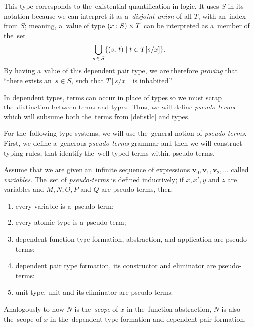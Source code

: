 This type corresponds to the~existential quantification in logic. It uses $S$ in
its notation because we can interpret it as a~\emph{disjoint union} of all $T$,
with an~index from $S$; meaning, a~value of type $(x \overset{}: S) \times T$ can be
interpreted as a~member of the~set
\[
  \bigcup_{s \, \in \, S} \{ (s, \, t) \mid t \in T[s/x] \}.
\]
By having a~value of this dependent pair type, we are therefore \emph{proving}
that ``there exists an~$s \in S$, such that $T[s/x]$ is inhabited.''

In dependent types, terms can occur in place of types so we must scrap
the~distinction between terms and types. Thus, we will define
\emph{pseudo-terms} which will subsume both the~terms from \autoref{def:stlc}
and types.


For the~following type systems, we will use the~general notion of
\emph{pseudo-terms}. First, we define a~generous \emph{pseudo-terms} grammar and
then we will construct typing rules, that identify the~well-typed terms within
pseudo-terms.

\begin{definition}\label{def:pseudo-term}
  Assume that we are given an~infinite sequence of expressions $\mathbf{v}_0,
  \mathbf{v}_1, \mathbf{v}_2, \dots$ called \emph{variables}. The~set of
  \emph{pseudo-terms} is defined inductively; if $x, x', y$ and $z$ are
  variables and $M, N, O, P$ and $Q$ are pseudo-terms, then:
  \begin{enumerate}
    \item every variable is a~pseudo-term;
    \item every atomic type is a~pseudo-term;
    \item dependent function type formation, abstraction, and application
      are pseudo-terms:
    \item dependent pair type formation, its constructor and eliminator are
      pseudo-terms:
    \item unit type, unit and its eliminator are pseudo-terms:
  \end{enumerate}
\end{definition}
Analogously to how $N$ is the~\emph{scope} of $x$ in the~function abstraction,
$N$ is also the~scope of $x$ in the~dependent type formation and dependent pair
formation.

